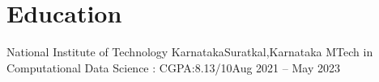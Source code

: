 \section{Education}
  \resumeSubHeadingListStart
    \resumeSubheading
      {National Institute of Technology Karnataka}{Suratkal,Karnataka}
      {MTech in Computational  Data Science : CGPA:8.13/10}{Aug 2021 -- May 2023}
      


  \resumeSubHeadingListEnd
